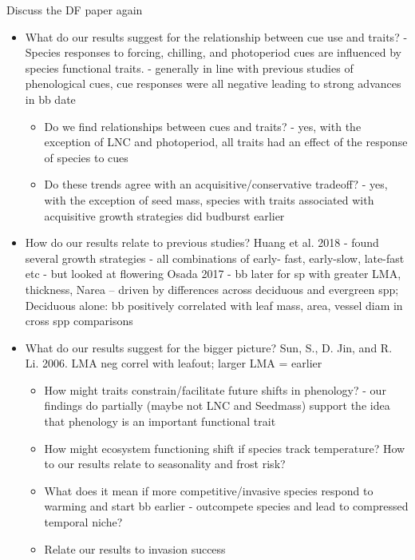 \documentclass{article}\usepackage[]{graphicx}\usepackage[]{color}
\begin{document}
Discuss the DF paper again 

\begin{itemize}
\item What do our results suggest for the relationship between cue use and traits? 
- Species responses to forcing, chilling, and photoperiod cues are influenced by species functional traits. 
- generally in line with previous studies of phenological cues, cue responses were all negative leading to strong advances in bb date 
	\begin{itemize}
	\item Do we find relationships between cues and traits?
	- yes, with the exception of LNC and photoperiod, all traits had an effect of the response of species to cues
	\item Do these trends agree with an acquisitive/conservative tradeoff?
	- yes, with the exception of seed mass, species with traits associated with acquisitive growth strategies did budburst earlier
	\end{itemize}
\item How do our results relate to previous studies? 
        Huang et al. 2018 - found several growth strategies - all combinations of early- fast, early-slow, late-fast etc - but looked at flowering
        Osada 2017 - bb later for sp with greater LMA, thickness, Narea – driven by differences across deciduous and evergreen spp; 	Deciduous alone: bb positively correlated with leaf mass, area, vessel diam in cross spp comparisons
\item What do our results suggest for the bigger picture?
Sun, S., D. Jin, and R. Li. 2006. LMA neg correl with leafout; larger LMA = earlier
	\begin{itemize}
	\item How might traits constrain/facilitate future shifts in phenology?
	- our findings do partially (maybe not LNC and Seedmass) support the idea that phenology is an important functional trait
	\item How might ecosystem functioning shift if species track temperature? How to our results relate to seasonality and frost risk?
	\item What does it mean if more competitive/invasive species respond to warming and start bb earlier - outcompete species and lead to compressed temporal niche?
	\item Relate our results to invasion success 
	\end{itemize}


\end{itemize}
\end{document}
